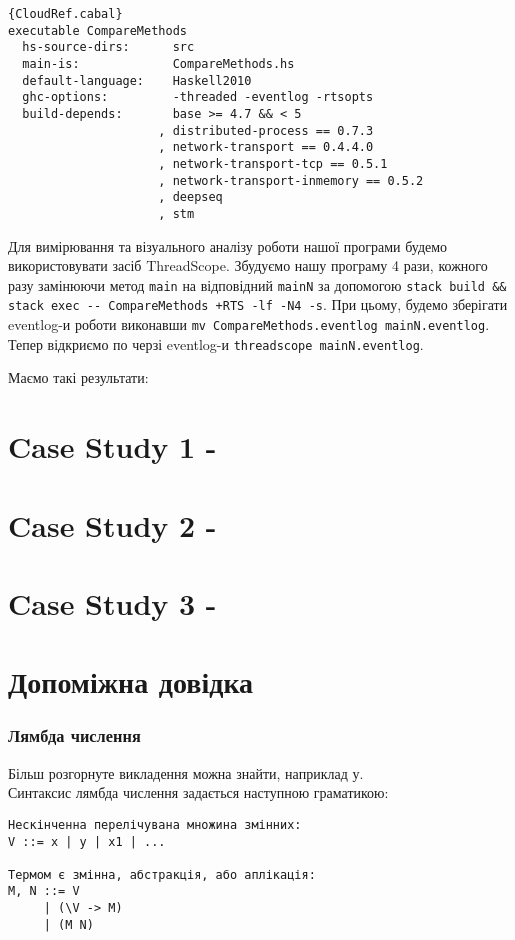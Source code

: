 \documentclass[12pt]{article}
\begin{document}
\begin{lstlisting}{CloudRef.cabal}
executable CompareMethods
  hs-source-dirs:      src
  main-is:             CompareMethods.hs
  default-language:    Haskell2010
  ghc-options:         -threaded -eventlog -rtsopts
  build-depends:       base >= 4.7 && < 5
                     , distributed-process == 0.7.3
                     , network-transport == 0.4.4.0
                     , network-transport-tcp == 0.5.1
                     , network-transport-inmemory == 0.5.2
                     , deepseq
                     , stm
\end{lstlisting}

Для вимірювання та візуального аналізу роботи нашої програми будемо використовувати засіб ThreadScope. Збудуємо нашу програму 4 рази, кожного разу замінюючи метод \lstinline{main} на відповідний \lstinline{mainN} за допомогою \lstinline{stack build && stack exec -- CompareMethods +RTS -lf -N4 -s}. При цьому, будемо зберігати eventlog-и роботи виконавши \lstinline{mv CompareMethods.eventlog mainN.eventlog}. Тепер відкриємо по черзі eventlog-и \lstinline{threadscope mainN.eventlog}.

Маємо такі результати:

\section{Case Study 1 - }
\section{Case Study 2 - }
\section{Case Study 3 - }

\section{Допоміжна довідка}

\subsubsection*{Лямбда числення}

Більш розгорнуте викладення можна знайти, наприклад у\cite{lambdaMoskvin}.\\

Синтаксис лямбда числення задається наступною граматикою:
\begin{lstlisting}[caption={Синтаксис простого безтипового лямбда числення}]
Нескінченна перелічувана множина змінних:
V ::= x | y | x1 | ... 

Термом є змінна, абстракція, або аплікація:
M, N ::= V
     | (\V -> M)
     | (M N)
\end{lstlisting}
\end{document}
